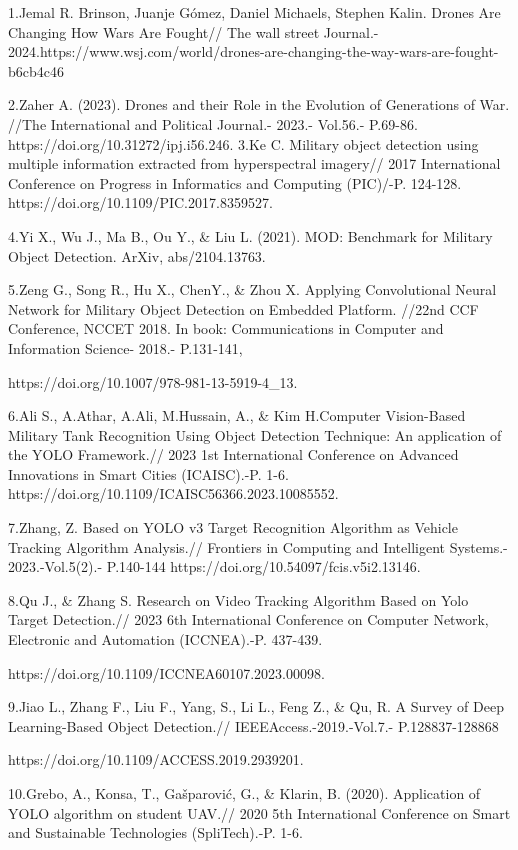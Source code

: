 \begin{noparindent}
1.Jemal R. Brinson, Juanje Gómez, Daniel Michaels, Stephen Kalin. Drones
Are Changing How Wars Are Fought// The wall street Journal.-
2024.https://www.wsj.com/world/drones-are-changing-the-way-wars-are-fought-b6cb4c46

2.Zaher A. (2023). Drones and their Role in the Evolution of Generations
of War. //The International and Political Journal.- 2023.- Vol.56.-
P.69-86. https://doi.org/10.31272/ipj.i56.246. 3.Ke C. Military object
detection using multiple information extracted from hyperspectral
imagery// 2017 International Conference on Progress in Informatics and
Computing (PIC)/-P. 124-128. https://doi.org/10.1109/PIC.2017.8359527.

4.Yi X., Wu J., Ma B., Ou Y., \& Liu L. (2021). MOD: Benchmark for
Military Object Detection. ArXiv, abs/2104.13763.

5.Zeng G., Song R., Hu X., ChenY., \& Zhou X. Applying Convolutional
Neural Network for Military Object Detection on Embedded Platform.
//22nd CCF Conference, NCCET 2018. In book: Communications in Computer
and Information Science- 2018.- P.131-141,

https://doi.org/10.1007/978-981-13-5919-4\_13.

6.Ali S., A.Athar, A.Ali, M.Hussain, A., \& Kim H.Computer Vision-Based
Military Tank Recognition Using Object Detection Technique: An
application of the YOLO Framework.// 2023 1st International Conference
on Advanced Innovations in Smart Cities (ICAISC).-P. 1-6.
https://doi.org/10.1109/ICAISC56366.2023.10085552.

7.Zhang, Z. Based on YOLO v3 Target Recognition Algorithm as Vehicle
Tracking Algorithm Analysis.// Frontiers in Computing and Intelligent
Systems.- 2023.-Vol.5(2).- P.140-144
https://doi.org/10.54097/fcis.v5i2.13146.~

8.Qu J., \& Zhang S. Research on Video Tracking Algorithm Based on Yolo
Target Detection.// 2023 6th International Conference on Computer
Network, Electronic and Automation (ICCNEA).-P. 437-439.

https://doi.org/10.1109/ICCNEA60107.2023.00098.

9.Jiao L., Zhang F., Liu F., Yang, S., Li L., Feng Z., \& Qu, R. A
Survey of Deep Learning-Based Object Detection.//
IEEEAccess.-2019.-Vol.7.- P.128837-128868

https://doi.org/10.1109/ACCESS.2019.2939201.

10.Grebo, A., Konsa, T., Gašparović, G., \& Klarin, B. (2020).
Application of YOLO algorithm on student UAV.// 2020 5th International
Conference on Smart and Sustainable Technologies (SpliTech).-P. 1-6.


\end{noparindent}
